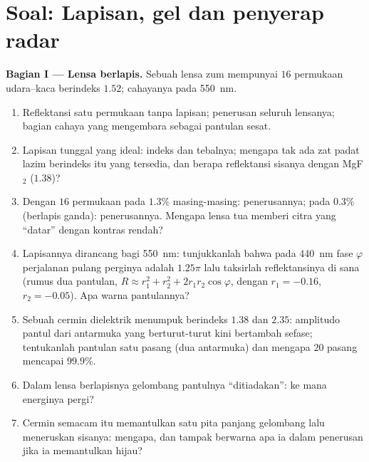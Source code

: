 \section{Soal: Lapisan, gel dan penyerap radar}

\begin{problem}
\label{pb:b2:wave-interfaces:1}

\medskip
\noindent\textbf{Bagian I --- Lensa berlapis.}
Sebuah lensa zum mempunyai $16$ permukaan udara--kaca berindeks $1.52$; cahayanya pada
\qty{550}{nm}.
\begin{enumerate}
  \item Reflektansi satu permukaan tanpa lapisan; penerusan seluruh
        lensanya; bagian cahaya yang mengembara sebagai pantulan sesat.
  \item Lapisan tunggal yang ideal: indeks dan tebalnya; mengapa tak ada
        zat padat lazim berindeks itu yang tersedia, dan berapa
        reflektansi sisanya dengan MgF$_2$ ($1.38$)?
  \item Dengan $16$ permukaan pada $1.3\%$ masing-masing: penerusannya; pada $0.3\%$
        (berlapis ganda): penerusannya. Mengapa lensa tua memberi citra yang ``datar''
        dengan kontras rendah?
  \item Lapisannya dirancang bagi \qty{550}{nm}: tunjukkanlah bahwa pada
        \qty{440}{nm} fase $\varphi$ perjalanan pulang perginya adalah $1.25\pi$ lalu
        taksirlah reflektansinya di sana (rumus dua pantulan, $R
        \approx r_1^2 + r_2^2 + 2r_1r_2\cos\varphi$, dengan $r_1 = -0.16$, $r_2 =
        -0.05$). Apa warna pantulannya?
  \item Sebuah cermin dielektrik menumpuk  berindeks $1.38$ dan
        $2.35$: amplitudo pantul dari antarmuka yang berturut-turut
        kini bertambah sefase; tentukanlah pantulan satu pasang (dua antarmuka) dan
        mengapa $20$ pasang mencapai $99.9\%$.
  \item Dalam lensa berlapisnya gelombang pantulnya ``ditiadakan'': ke mana
        energinya pergi?
  \item Cermin semacam itu memantulkan satu pita panjang gelombang lalu meneruskan
        sisanya: mengapa, dan tampak berwarna apa ia dalam penerusan
        jika ia memantulkan hijau?
\end{enumerate}


\end{problem}
